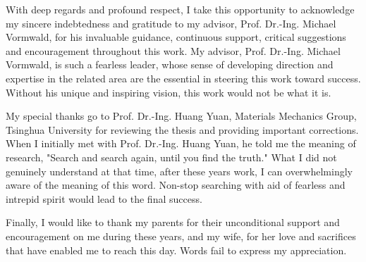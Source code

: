 

With deep regards and profound respect, I take this opportunity to acknowledge my sincere indebtedness and gratitude to my advisor, Prof. Dr.-Ing. Michael Vormwald, for his invaluable guidance, continuous support, critical suggestions and encouragement throughout this work.
My advisor, Prof. Dr.-Ing. Michael Vormwald, is such a fearless leader, whose sense of developing direction and expertise in the related area are the essential in steering this work toward success.
Without his unique and inspiring vision, this work would not be what it is.

My special thanks go to Prof. Dr.-Ing. Huang Yuan, Materials Mechanics Group, Tsinghua University for reviewing the thesis and providing important corrections. 
When I initially met with Prof. Dr.-Ing. Huang Yuan, he told me the meaning of research, "Search and search again, until you find the truth."
What I did not genuinely understand at that time, after these years work, I can overwhelmingly aware of the meaning
of this word. Non-stop searching with aid of fearless and intrepid spirit would lead to the final success.


Finally, I would like to thank my parents for their unconditional support and encouragement on me during these years, and my wife, for her love and sacrifices that have enabled me to reach this day. Words fail to express my appreciation.


